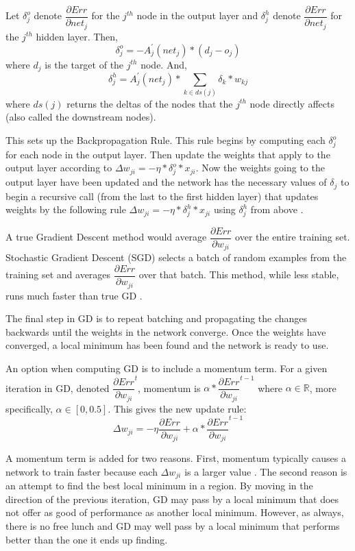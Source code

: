 \documentclass[twoside,11pt]{article}
\newcommand{\jth}{$j^{th}$ }
\begin{document}
Let $\delta _j^o$ denote $\dfrac{\partial Err}{\partial net_{j}}$ for the \jth node in the output layer and $\delta ^h_j$ denote $\dfrac{\partial Err}{\partial net_{j}}$ for the \jth hidden layer. 
Then, 
$$\delta _j^o = -A^\prime _j (net_j) * (d_j - o_j)$$
where $d_j$ is the target of the \jth node. And, 
$$\delta ^h_j = A^\prime _j (net_j) * \sum_{k \in ds(j)} \delta _k * w_{kj}$$ 
where $ds(j)$ returns the deltas of the nodes that the \jth node directly affects (also called the downstream nodes).

This sets up the Backpropagation Rule. This rule begins by computing each $\delta _j^o$ for each node in the output layer. Then update the weights that apply to the output layer according to 
$\Delta w_{ji} = - \eta * \delta _j^o * x_{ji}$.
Now the weights going to the output layer have been updated and the network has the necessary values of $\delta _j$ to begin a recursive call (from the last to the first hidden layer) that updates weights by the following rule
$\Delta w_{ji} = - \eta * \delta _j^h * x_{ji}$ using $\delta _j^h$ 
from above \citep{rumelhart1988learning}.

A true Gradient Descent method would average $\dfrac{\partial Err}{\partial w_{ji}}$ over the entire training set. Stochastic Gradient Descent (SGD) selects a batch of random examples from the training set and averages $\dfrac{\partial Err}{\partial w_{ji}}$ over that batch. This method, while less stable, runs much faster than true GD \citep{svozil1997ffnn}.

The final step in GD is to repeat batching and propagating the changes backwards until the weights in the network converge. Once the weights have converged, a local minimum has been found and the network is ready to use.

An option when computing GD is to include a momentum term. For a given iteration in GD, denoted 
$\dfrac{\partial Err}{\partial w_{ji}}^t$, momentum is $\alpha * \dfrac{\partial Err}{\partial w_{ji}}^{t-1}$ where $\alpha \in \mathbb{R}$, more specifically, $\alpha \in [0,0.5]$.
This gives the new update rule: 
$$\Delta w_{ji} = - \eta \dfrac{\partial Err}{\partial w_{ji}} + \alpha * \dfrac{\partial Err}{\partial w_{ji}}^{t-1}$$

A momentum term is added for two reasons. First, momentum typically causes a network to train faster because each $\Delta w_{ji}$ is a larger value \citep{rumelhart1988learning}.
The second reason is an attempt to find the best local minimum in a region. 
By moving in the direction of the previous iteration, GD may pass by a local minimum that does not offer as good of performance as another local minimum. 
However, as always, there is no free lunch and GD may well pass by a local minimum that performs better than the one it ends up finding.
\end{document}
